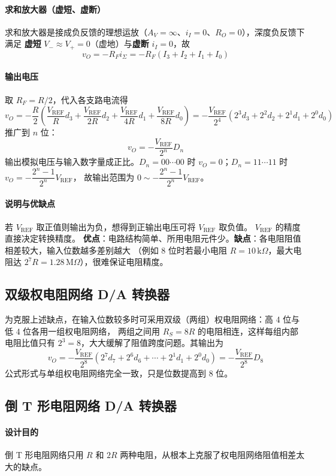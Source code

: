 \paragraph{求和放大器（虚短、虚断）}
求和放大器是接成负反馈的理想运放（$A_V=\infty$、$i_I=0$、$R_O=0$），深度负反馈下满足
\textbf{虚短} $V_-\approx V_+=0$（虚地）与\textbf{虚断} $i_I=0$，故
\[
v_O=-R_Fi_\Sigma=-R_F\left(I_3+I_2+I_1+I_0\right)
\]

\paragraph{输出电压}
取 $R_F=R/2$，代入各支路电流得
\[
v_O=-\frac{R}{2}\left(\frac{V_\text{REF}}{R}d_3+\frac{V_\text{REF}}{2R}d_2+\frac{V_\text{REF}}{4R}d_1+\frac{V_\text{REF}}{8R}d_0\right)
=-\frac{V_\text{REF}}{2^4}\left(2^3d_3+2^2d_2+2^1d_1+2^0d_0\right)
\]
推广到 $n$ 位：
\[
v_O=-\frac{V_\text{REF}}{2^n}D_n
\]
输出模拟电压与输入数字量成正比。$D_n=00\cdots00$ 时 $v_O=0$；$D_n=11\cdots11$ 时 $v_O=-\dfrac{2^n-1}{2^n}V_\text{REF}$，
故输出范围为 $0\sim-\dfrac{2^n-1}{2^n}V_\text{REF}$。

\paragraph{说明与优缺点}
若 $V_\text{REF}$ 取正值则输出为负，想得到正输出电压可将 $V_\text{REF}$ 取负值。
$V_\text{REF}$ 的精度直接决定转换精度。
\textbf{优点}：电路结构简单、所用电阻元件少。\textbf{缺点}：各电阻阻值相差较大，输入位数越多差别越大
（例如 8 位时若最小电阻 $R=10\,\mathrm{k}\Omega$，最大电阻达 $2^7R=1.28\,\mathrm{M}\Omega$），很难保证电阻精度。

\subsection{双级权电阻网络 D/A 转换器}
为克服上述缺点，在输入位数较多时可采用双级（两组）权电阻网络：高 4 位与低 4 位各用一组权电阻网络，
两组之间用 $R_S=8R$ 的电阻相连，这样每组内部电阻比值只有 $2^3=8$，大大缓解了阻值跨度问题。其输出为
\[
v_O=-\frac{V_\text{REF}}{2^8}\left(2^7d_7+2^6d_6+\cdots+2^1d_1+2^0d_0\right)=-\frac{V_\text{REF}}{2^8}D_8
\]
公式形式与单组权电阻网络完全一致，只是位数提高到 8 位。

\subsection{倒 T 形电阻网络 D/A 转换器}
\paragraph{设计目的}
倒 T 形电阻网络只用 $R$ 和 $2R$ 两种电阻，从根本上克服了权电阻网络阻值相差太大的缺点。

